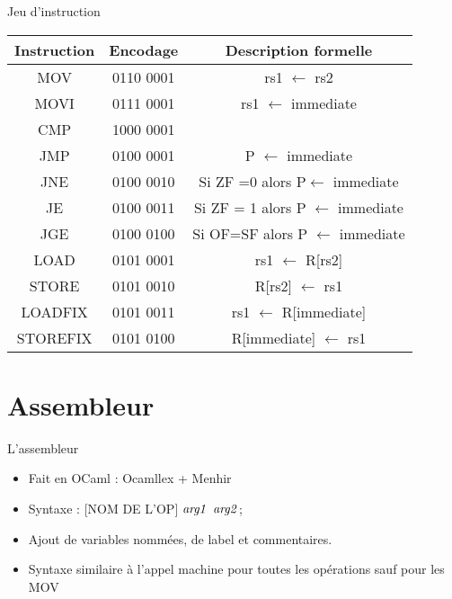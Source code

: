\documentclass{beamer}
\begin{document}
    \begin{frame}{Jeu d'instruction}

        \begin{center}
        \begin{tabular}{| c || c | c |}
            Instruction & Encodage & Description formelle \\ \hline
            MOV   & 0110 0001 & rs1 $\gets$ rs2\\ \hline
            MOVI  & 0111 0001 & rs1 $\gets$ immediate\\\hline
            CMP   & 1000 0001 & \\ \hline
            JMP   & 0100 0001 & P $\gets$ immediate\\ \hline
            JNE   & 0100 0010 & Si ZF =0 alors P$\gets$ immediate\\ \hline
            JE    & 0100 0011 &  Si ZF = 1 alors P $\gets$ immediate \\ \hline
            JGE   & 0100 0100 & Si OF=SF alors P $\gets$ immediate\\ \hline
            LOAD  & 0101 0001 & rs1 $\gets$ R[rs2]\\ \hline
            STORE & 0101 0010 & R[rs2] $\gets$ rs1\\ \hline
            LOADFIX  & 0101 0011 & rs1 $\gets$ R[immediate]\\ \hline
            STOREFIX & 0101 0100 & R[immediate] $\gets$ rs1\\ \hline
        \end{tabular}
    \end{center}

    \end{frame}

\section{Assembleur}
    \begin{frame}
    \end{frame}
\begin{frame}{L'assembleur}
  \begin{itemize}
      \item Fait en OCaml : Ocamllex + Menhir
      \item Syntaxe : [NOM DE L'OP] $\it{arg1}$ $\it{arg2}$;
      \item Ajout de variables nommées, de label et commentaires.
      \item Syntaxe similaire à l'appel machine pour toutes les opérations sauf pour les MOV
  \end{itemize}
\end{frame}
\end{document}
